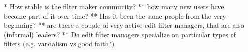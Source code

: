 \begin{comment}
    From filter-lists/edit-filter-managers-bot-operators
* 893, Predatory open access journals - introduced by Beetstra on 6.12.2017 and deleted again the same day https://en.wikipedia.org/wiki/Special:AbuseFilter/history?user=&filter=893 (probably doubling since filter 891 is already  named "Predatory open access journals" and was introduced on 3.12.2017 https://en.wikipedia.org/wiki/Special:AbuseFilter/history?user=&filter=891 ; Beetstra added some additional domains to check to this filter on 11.12.2017 https://en.wikipedia.org/wiki/Special:AbuseFilter/history/891/diff/prev/18262); since both filters were introduced so close in time to one another I can imagine that there was an incident/discussion/request for such a filter and two different people went on and implemented it without coordinating with eachother.
\end{comment}

* How stable is the filter maker community?
  ** how many new users have become part of it over time?
  ** Has it been the same people from the very beginning?
  ** are there a couple of very active edit filter managers, that are also (informal) leaders?
  ** Do edit filter managers specialize on particular types of filters (e.g. vandalism vs good faith?)

